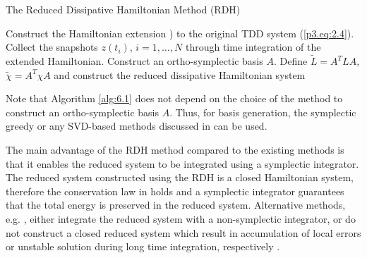 \begin{algorithm} 
\caption{The Reduced Dissipative Hamiltonian Method (RDH)} \label{alg:6.1}
\begin{algorithmic} [1]
	\State Construct the Hamiltonian extension ) to the original TDD system (\ref{p3.eq:2.4}).
	\State Collect the snapshots $z(t_i)$, $i=1,\dots,N$ through time integration of the extended Hamiltonian.
	\State Construct an ortho-symplectic basis $A$.
	\State Define $\tilde L = A^T L A$, $\tilde \chi = A^T \chi A$ and construct the reduced dissipative Hamiltonian system 
\end{algorithmic}
\vspace{0.5cm}
\end{algorithm}

Note that Algorithm \ref{alg:6.1} does not depend on the choice of the method to construct an ortho-symplectic basis $A$. Thus, for basis generation, the symplectic greedy or any SVD-based methods discussed in  can be used.

The main advantage of the RDH method compared to the existing methods is that it enables the reduced system to be integrated using a symplectic integrator. The reduced system constructed using the RDH is a closed Hamiltonian system, therefore the conservation law in  holds and a symplectic integrator guarantees that the total energy is preserved in the reduced system. Alternative methods, e.g. \cite{peng2016geometric,polyuga2010structure,beattie2011structure}, either integrate the reduced system with a non-symplectic integrator, or do not construct a closed reduced system which result in accumulation of local errors or unstable solution during long time integration, respectively \cite{hairer2006geometric}.

